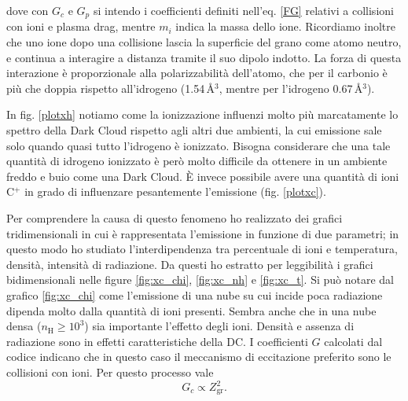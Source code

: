 dove con $G_c$ e $G_p$ si intendo i coefficienti definiti nell'eq. \ref{FG} relativi a collisioni con ioni e plasma drag, mentre $m_i$ indica la massa dello ione. Ricordiamo inoltre che uno ione dopo una collisione lascia la superficie del grano come atomo neutro, e continua a interagire a distanza tramite il suo dipolo indotto. La forza di questa interazione è proporzionale alla polarizzabilità dell'atomo, che per il carbonio è più che doppia rispetto all'idrogeno (1.54\,\AA{}$^3$, mentre per l'idrogeno 0.67\,\AA{}$^3$). 


In fig. \ref{plotxh} notiamo come la ionizzazione influenzi molto più marcatamente lo spettro della Dark Cloud rispetto agli altri due ambienti, la cui emissione sale solo quando quasi tutto l'idrogeno è ionizzato. Bisogna considerare che una tale quantità di idrogeno ionizzato è però molto difficile da ottenere in un ambiente freddo e buio come una Dark Cloud. È invece possibile avere una quantità di ioni C$^+$ in grado di influenzare pesantemente l'emissione (fig. \ref{plotxc}).

Per comprendere la causa di questo fenomeno ho realizzato dei grafici tridimensionali in cui è rappresentata l'emissione in funzione di due parametri; in questo modo ho studiato l'interdipendenza tra percentuale di ioni e temperatura, densità, intensità di radiazione.
Da questi ho estratto per leggibilità i grafici bidimensionali nelle figure \ref{fig:xc_chi}, \ref{fig:xc_nh} e \ref{fig:xc_t}. Si può notare dal grafico \ref{fig:xc_chi} come l'emissione di una nube su cui incide poca radiazione dipenda molto dalla quantità di ioni presenti. Sembra anche che in una nube densa ($n_\mathrm{H}\geqslant10^3$) sia importante l'effetto degli ioni. Densità e assenza di radiazione sono in effetti caratteristiche della DC. I coefficienti $G$ calcolati dal codice indicano che in questo caso il meccanismo di eccitazione preferito sono le collisioni con ioni. Per questo processo vale \parencite{Ali}
\begin{equation}
G_c \propto Z_\mathrm{gr}^2.
\end{equation}

